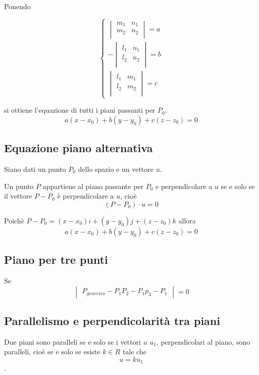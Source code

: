 Ponendo

$$
\begin{cases}
\begin{vmatrix}
m_1 & n_1 \\
m_2 & n_2 \\
\end{vmatrix} = a \\
- \begin{vmatrix}
l_1 & n_1 \\
l_2 & n_2 \\
\end{vmatrix} = b \\
\begin{vmatrix}
l_1 & m_1 \\
l_2 & m_2 \\
\end{vmatrix} = c
\end{cases}
$$

si ottiene l'equazione di tutti i piani passanti per $P_0$.
$$
a(x-x_0) + b(y-y_0) + c(z-z_0) = 0
$$

\subsection{Equazione piano alternativa}

Siano dati un punto $P_0$ dello spazio e un vettore $u$.

Un punto $P$ appartiene al piano passante per $P_0$ e perpendicolare a $u$ se e solo se il vettore $P-P_0$ è perpendicolare a $u$, cioè $$(P-P_0) \cdot u =0$$

Poichè $P-P_0 = (x-x_0)i + (y-y_0)j +(z-z_0)k$ allora $$ a(x-x_0) + b(y-y_0) +c(z-z_0) = 0$$

\subsection{Piano per tre punti}

Se
$$
\begin{vmatrix}
P_{generico} - P_1
P_2 - P_1
p_3 - P_1
\end{vmatrix} = 0
$$

\subsection{Parallelismo e perpendicolarità tra piani}

Due piani sono paralleli se e solo se i vettori $u$ $u_1$, perpendicolari al piano, sono paralleli, cioè se e solo se esiste $k \in R$ tale che $$u = k u_1$$.


